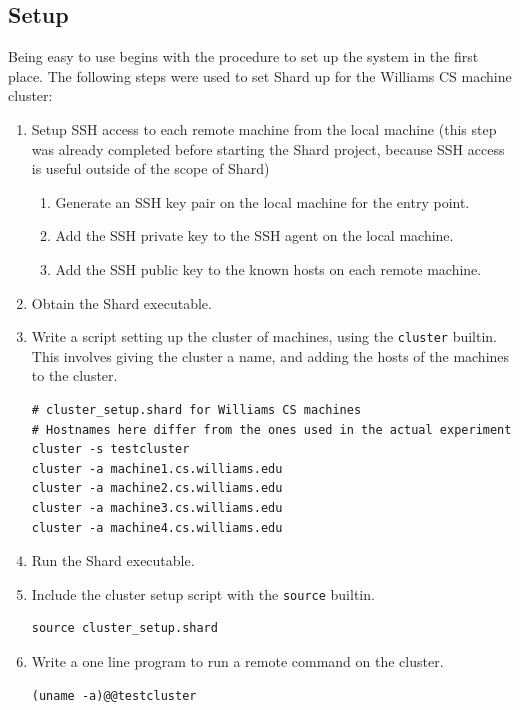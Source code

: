 \documentclass[twoside]{report}
\begin{document}
\subsection{Setup}

Being easy to use begins with the procedure to set up the system in the first place.
The following steps were used to set Shard up for the Williams CS machine cluster:
\begin{enumerate}
  \item Setup SSH access to each remote machine from the local machine (this step was already completed before starting the Shard project, because SSH access is useful outside of the scope of Shard)
        \begin{enumerate}
          \item Generate an SSH key pair on the local machine for the entry point.
          \item Add the SSH private key to the SSH agent on the local machine.
          \item Add the SSH public key to the known hosts on each remote machine.
        \end{enumerate}
  \item Obtain the Shard executable.
  \item Write a script setting up the cluster of machines, using the \texttt{cluster} builtin. This involves giving the cluster a name, and adding the hosts of the machines to the cluster.

        \begin{minipage}[c]{\textwidth-15pt}
          \begin{lstlisting}[language=Shard]
# cluster_setup.shard for Williams CS machines
# Hostnames here differ from the ones used in the actual experiment
cluster -s testcluster
cluster -a machine1.cs.williams.edu
cluster -a machine2.cs.williams.edu
cluster -a machine3.cs.williams.edu
cluster -a machine4.cs.williams.edu
\end{lstlisting}
          \smallskip
        \end{minipage}

  \item Run the Shard executable.
  \item Include the cluster setup script with the \texttt{source} builtin.

        \begin{minipage}[c]{\textwidth-15pt}
          \begin{lstlisting}[language=Shard]
source cluster_setup.shard
\end{lstlisting}
          \smallskip
        \end{minipage}

  \item Write a one line program to run a remote command on the cluster.

        \begin{minipage}[c]{\textwidth-15pt}
          \begin{lstlisting}[language=Shard]
(uname -a)@@testcluster
\end{lstlisting}
          \smallskip
        \end{minipage}

\end{enumerate}
\end{document}
